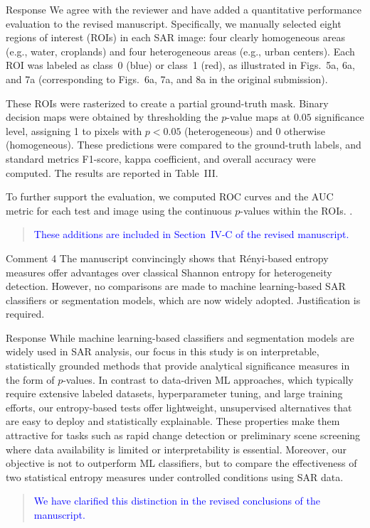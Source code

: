 \documentclass[11pt]{report}
\begin{document}
\begin{responsebox}{Response}
We agree with the reviewer and have added a quantitative performance evaluation to the revised manuscript. Specifically, we manually selected eight regions of interest (ROIs) in each SAR image: four clearly homogeneous areas (e.g., water, croplands) and four heterogeneous areas (e.g., urban centers). Each ROI was labeled as class~0 (blue) or class~1 (red), as illustrated in Figs.~5a, 6a, and 7a (corresponding to Figs.~6a, 7a, and 8a in the original submission).

These ROIs were rasterized to create a partial ground-truth mask. Binary decision maps were obtained by thresholding the $p$-value maps at $ 0.05$ significance level, assigning 1 to pixels with $p < 0.05$ (heterogeneous) and 0 otherwise (homogeneous). These predictions were compared to the ground-truth labels, and standard metrics F1-score, kappa coefficient, and overall accuracy were computed. The results are reported in Table~III.

To further support the evaluation, we computed ROC curves and the AUC metric for each test and image using the continuous $p$-values within the ROIs. .
\begin{quote}
\textcolor{blue}{These additions are included in Section~IV-C of the revised manuscript. }
\end{quote}

\end{responsebox}



\begin{reviewbox}{Comment 4}
The manuscript convincingly shows that Rényi-based entropy measures offer advantages over classical Shannon entropy for heterogeneity detection. However, no comparisons are made to machine learning-based SAR classifiers or segmentation models, which are now widely adopted. Justification is required.
\end{reviewbox}
\begin{responsebox}{Response}
While machine learning-based classifiers and segmentation models are widely used in SAR analysis, our focus in this study is on interpretable, statistically grounded methods that provide analytical significance measures in the form of $p$-values. 
 In contrast to data-driven ML approaches, which typically require extensive labeled datasets, hyperparameter tuning, and large training efforts, our entropy-based tests offer lightweight, unsupervised alternatives that are easy to deploy and statistically explainable. These properties make them attractive for tasks such as rapid change detection or preliminary scene screening where data availability is limited or interpretability is essential. Moreover, our objective is not to outperform ML classifiers, but to compare the effectiveness of two statistical entropy measures under controlled conditions using SAR data.
\begin{quote}
\textcolor{blue}{We have clarified this distinction in the revised conclusions of the manuscript.}
\end{quote}
\end{responsebox}
\end{document}
